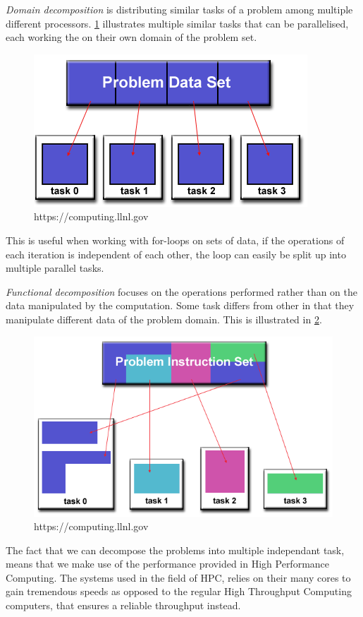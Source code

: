 \emph{Domain decomposition} is distributing similar tasks of a problem among multiple different processors. \cref{dom} illustrates multiple similar tasks that can be parallelised, each working the on their own domain of the problem set.

\begin{figure}[htbp]\label{dom}
\includegraphics[width=\textwidth]{Analysis/Supercomputing/domain_decomp.png}
\caption{https://computing.llnl.gov}
\end{figure}

This is useful when working with for-loops on sets of data, if the operations of each iteration is independent of each other, the loop can easily be split up into multiple parallel tasks.

\emph{Functional decomposition} focuses on the operations performed rather than on the data manipulated by the computation. Some task differs from other in that they manipulate different data of the problem domain. This is illustrated in \cref{fun}.

\begin{figure}[htbp]\label{fun}
\includegraphics[width=\textwidth]{Analysis/Supercomputing/functional_decomp.png}
\caption{https://computing.llnl.gov}
\end{figure}

The fact that we can decompose the problems into multiple independant task, means that we make use of the performance provided in High Performance Computing. The systems used in the field of HPC, relies on their many cores to gain tremendous speeds as opposed to the regular High Throughput Computing computers, that ensures a reliable throughput instead.
